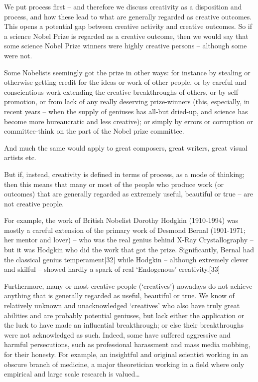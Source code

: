 \documentclass[
]{book}
\begin{document}
We put process first -- and therefore we discuss creativity as a disposition and process, and how these lead to what are generally regarded as creative outcomes. This opens a potential gap between creative activity and creative outcomes. So if a science Nobel Prize is regarded as a creative outcome, then we would say that some science Nobel Prize winners were highly creative persons -- although some were not.

Some Nobelists seemingly got the prize in other ways: for instance by stealing or otherwise getting credit for the ideas or work of other people, or by careful and conscientious work extending the creative breakthroughs of others, or by self-promotion, or from lack of any really deserving prize-winners (this, especially, in recent years -- when the supply of geniuses has all-but dried-up, and science has become more bureaucratic and less creative); or simply by errors or corruption or committee-think on the part of the Nobel prize committee.

And much the same would apply to great composers, great writers, great visual artists etc.

But if, instead, creativity is defined in terms of process, as a mode of thinking; then this means that many or most of the people who produce work (or outcomes) that are generally regarded as extremely useful, beautiful or true -- are not creative people.

For example, the work of British Nobelist Dorothy Hodgkin (1910-1994) was mostly a careful extension of the primary work of Desmond Bernal (1901-1971; her mentor and lover) -- who was the real genius behind X-Ray Crystallography -- but it was Hodgkin who did the work that got the prize. Significantly, Bernal had the classical genius temperament{[}32{]} while Hodgkin -- although extremely clever and skilful -- showed hardly a spark of real `Endogenous' creativity.{[}33{]}

Furthermore, many or most creative people (`creatives') nowadays do not achieve anything that is generally regarded as useful, beautiful or true. We know of relatively unknown and unacknowledged `creatives' who also have truly great abilities and are probably potential geniuses, but lack either the application or the luck to have made an influential breakthrough; or else their breakthroughs were not acknowledged as such. Indeed, some have suffered aggressive and harmful persecutions, such as professional harassment and mass media mobbing, for their honesty. For example, an insightful and original scientist working in an obscure branch of medicine, a major theoretician working in a field where only empirical and large scale research is valued\ldots{}
\end{document}
